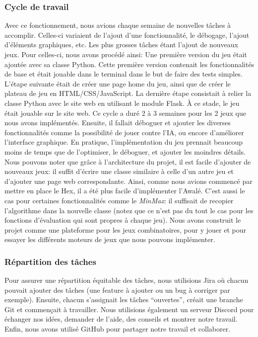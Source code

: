 \subsubsection{Cycle de travail}
Avec ce fonctionnement, nous avions chaque semaine de nouvelles tâches à accomplir. Celles-ci variaient de l'ajout d'une fonctionnalité, le débogage, l'ajout d'éléments graphiques, etc.
Les plus grosses tâches étant l'ajout de nouveaux jeux. Pour celles-ci, nous avons procédé ainsi:
Une première version du jeu était ajoutée avec sa classe Python. Cette première version contenait les fonctionnalités de base et était jouable dans le terminal dans le but de faire des tests simples. 
L'étape suivante était de créer une page home du jeu, ainsi que de créer le plateau de jeu en HTML/CSS/JavaScript. La dernière étape consistait à relier la classe 
Python avec le site web en utilisant le module Flask.
À ce stade, le jeu était jouable sur le site web. Ce cycle a duré 2 à 3 semaines pour les 2 jeux que nous avons implémentés. Ensuite, il fallait déboguer et ajouter les 
diverses fonctionnalités comme la possibilité de jouer contre l'IA, ou encore d'améliorer l'interface graphique. En pratique, l'implémentation du jeu prennait beaucoup moins de temps que de l'optimiser, 
le déboguer, et ajouter les moindres détails.
Nous pouvons noter que grâce à l'architecture du projet, il est facile d'ajouter de nouveaux jeux: il suffit d'écrire une classe similaire à celle d'un autre jeu et d'ajouter une 
page web correspondante. Ainsi, comme nous avions commencé par mettre en place le Hex, il a été plus facile d'implémenter l'Awalé.
C'est aussi le cas pour certaines fonctionnalités comme le \emph{MinMax}: il suffisait de recopier l'algorithme dans la nouvelle classe (notez que ce n'est pas du 
tout le cas pour les fonctions d'évaluation qui sont propres à chaque jeu).
Nous avons construit le projet comme une plateforme pour les jeux combinatoires, pour y jouer et pour essayer les différents moteurs de jeux que nous pouvons implémenter.

\subsubsection{Répartition des tâches}
Pour assurer une répartition équitable des tâches, nous utilisions Jira où chacun pouvait ajouter des tâches (une feature à ajouter ou un bug à corriger par exemple). 
Ensuite, chacun s'assignait les tâches ``ouvertes'', créait une branche Git et commençait à travailler. Nous utilisions également un serveur Discord pour échanger 
nos idées, demander de l'aide, des conseils et montrer notre travail. Enfin, nous avons utilisé GitHub pour partager notre travail et collaborer.



